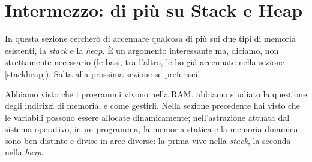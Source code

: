  \section{Intermezzo: di più su Stack e Heap}
 In questa sezione cercherò di accennare qualcosa di più sui due tipi di memoria esistenti, la \emph{stack} e la \emph{heap}. È un argomento interessante ma, diciamo, non strettamente necessario (le basi, tra l'altro, le ho già accennate nella sezione \ref{stackheap}). Salta alla prossima sezione se preferisci!\\
 
 \begin{small}
 Abbiamo visto che i programmi vivono nella RAM, abbiamo studiato la questione degli indirizzi di memoria, e come gestirli. Nella sezione precedente hai visto che le variabili possono essere allocate dinamicamente; nell'astrazione attuata dal sistema operativo, in un programma, la memoria statica e la memoria dinamica sono ben distinte e divise in aree diverse: la prima vive nella \emph{stack}, la seconda nella \emph{heap}.

 
 

\end{small}
